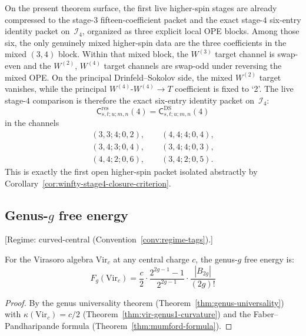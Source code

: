 On the present theorem surface, the first live higher-spin stages are
already compressed to the stage-$3$ fifteen-coefficient packet and the
exact stage-$4$ six-entry identity packet on~$\mathcal{I}_4$, organized
as three explicit local OPE blocks.  Among those six, the only genuinely
mixed higher-spin data are
the three coefficients in the mixed $(3,4)$ block.  Within that mixed
block, the $W^{(3)}$ target channel is swap-even and the
$W^{(2)}$, $W^{(4)}$ target channels are swap-odd under reversing the
mixed OPE.  On the principal Drinfeld--Sokolov side, the mixed
$W^{(2)}$ target vanishes, while the principal
$W^{(4)}$-$W^{(4)}\to T$ coefficient is fixed to `2'.  The live
stage-$4$ comparison is therefore the exact six-entry identity packet
on~$\mathcal{I}_4$:
\[
\mathsf{C}^{\mathrm{res}}_{s,t;u;m,n}(4)
=
\mathsf{C}^{\mathrm{DS}}_{s,t;u;m,n}(4)
\]
in the channels
\[
\begin{gathered}
(3,3;4;0,2),\qquad
(4,4;4;0,4),\\
(3,4;3;0,4),\qquad
(3,4;4;0,3),\\
(4,4;2;0,6),\qquad
(3,4;2;0,5).
\end{gathered}
\]
This is exactly the first open higher-spin packet isolated abstractly
by Corollary~\ref{cor:winfty-stage4-closure-criterion}.

\subsection{\texorpdfstring{Genus-$g$ free energy}{Genus-g free energy}}\label{subsec:vir-free-energy}

\begin{theorem}\label{thm:vir-all-genera}
\textup{[Regime: curved-central
\textup{(}Convention~\textup{\ref{conv:regime-tags})}.]}

For the Virasoro algebra $\mathrm{Vir}_c$ at any central charge $c$, the genus-$g$ free energy is:
\begin{equation}\label{eq:vir-Fg}
F_g(\mathrm{Vir}_c) = \frac{c}{2} \cdot \frac{2^{2g-1}-1}{2^{2g-1}} \cdot \frac{|B_{2g}|}{(2g)!}
\end{equation}
\end{theorem}

\begin{proof}
By the genus universality theorem (Theorem~\ref{thm:genus-universality}) with $\kappa(\mathrm{Vir}_c) = c/2$ (Theorem~\ref{thm:vir-genus1-curvature}) and the Faber--Pandharipande formula (Theorem~\ref{thm:mumford-formula}).
\end{proof}

